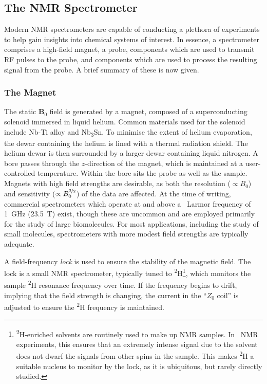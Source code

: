 \subsection{The NMR Spectrometer}

Modern \ac{NMR} spectrometers are capable of conducting a plethora of
experiments to help gain insights into chemical systems of interest.
In essence, a spectrometer comprises a high-field magnet, a probe, components
which are used to transmit \ac{RF} pulses to the probe, and components which
are used to process the resulting signal from the probe. A brief summary of
these is now given.

\subsubsection{The Magnet}
The static $\symbf{B}_0$ field is generated by a magnet, composed of a
superconducting solenoid immersed in liquid helium. Common materials used for
the solenoid include Nb-Ti alloy and Nb\textsubscript{3}Sn. To minimise the
extent of helium evaporation, the dewar containing the helium is lined with
a thermal radiation shield. The helium dewar is then surrounded by a larger
dewar containing liquid nitrogen. A bore passes through the $z$-direction of
the magnet, which is maintained at a user-controlled temperature. Within the
bore sits the probe as well as the sample. Magnets with high field
strengths are desirable, as both the resolution ($\propto B_0$) and sensitivity ($\propto
B_0^{\nicefrac{3}{2}}$) of the data are affected. At the
time of writing, commercial spectrometers which operate at and above a
\proton\ Larmor frequency of \qty{1}{\giga\hertz} (\qty{23.5}{\tesla}) exist,
though these are uncommon and are employed primarily for the study of large
biomolecules. For most applications, including the study of small molecules,
spectrometers with more modest field strengths are typically adequate.

A field-frequency \emph{lock} is used to ensure the stability of the magnetic
field.  The lock is a small \ac{NMR} spectrometer, typically
tuned to \textsuperscript{2}H\footnote{
    \textsuperscript{2}H-enriched solvents are routinely used to make up
    \ac{NMR} samples. In \proton\ \ac{NMR} experiments, this ensures that an
    extremely intense signal due to the solvent does not dwarf the signals from
    other spins in the sample. This makes \textsuperscript{2}H a suitable
    nucleus to monitor by the lock, as it is ubiquitous, but rarely directly
    studied.
}, which monitors the sample \textsuperscript{2}H resonance frequency over
time. If the frequency begins to drift, implying that the field strength is
changing, the current in the ``$Z_0$ coil'' is adjusted to ensure the
\textsuperscript{2}H frequency is maintained.

